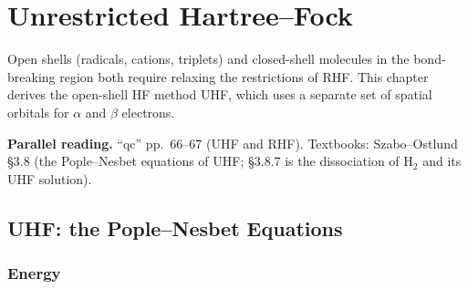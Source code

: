 \chapter{Unrestricted Hartree--Fock}
\label{ch:uhf}

Open shells (radicals, cations, triplets) and closed-shell molecules in the bond-breaking region both require relaxing the restrictions of RHF. This chapter derives the open-shell HF method UHF, which uses a separate set of spatial orbitals for $\alpha$ and $\beta$ electrons.

\textbf{Parallel reading.} “qc” pp.~66--67 (UHF and RHF). Textbooks: Szabo--Ostlund §3.8 (the Pople--Nesbet equations of UHF; §3.8.7 is the dissociation of H$_2$ and its UHF solution).

\section{UHF: the Pople--Nesbet Equations}

\subsection{Energy}

